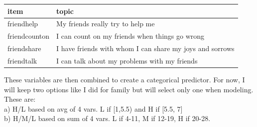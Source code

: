 \documentclass[
]{article}
\begin{document}
\begin{longtable}[]{@{}
  >{\raggedright\arraybackslash}p{}
  >{\raggedright\arraybackslash}p{}@{}}
\toprule\noalign{}
\begin{minipage}[b]{\linewidth}\raggedright
item
\end{minipage} & \begin{minipage}[b]{\linewidth}\raggedright
topic
\end{minipage} \\
\midrule\noalign{}
\endhead
\bottomrule\noalign{}
\endlastfoot
friendhelp & My friends really try to help me \\
friendcounton & I can count on my friends when things go wrong \\
friendshare & I have friends with whom I can share my joys and
sorrows \\
friendtalk & I can talk about my problems with my friends \\
\end{longtable}

These variables are then combined to create a categorical predictor. For
now, I will keep two options like I did for family but will select only
one when modeling. These are:\\
a) H/L based on avg of 4 vars. L if {[}1,5.5) and H if {[}5.5, 7{]}\\
b) H/M/L based on sum of 4 vars. L if 4-11, M if 12-19, H if 20-28.
\end{document}
